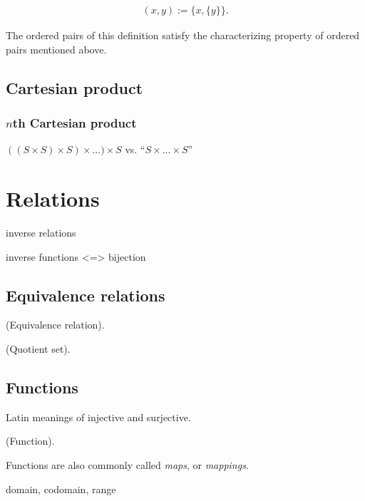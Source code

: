 \begin{align*}
    (x, y) := \{x, \{y\}\}.
\end{align*}

The ordered pairs of this definition satisfy the characterizing property of ordered pairs mentioned above.

\subsection*{Cartesian product}

\subsubsection*{$n$th Cartesian product}

$((S \times S) \times S) \times ...) \times S$ vs. ``$S \times ... \times S$''

\newpage

\section{Relations}

inverse relations

inverse functions <=> bijection

\subsection*{Equivalence relations}

\begin{defn}
    (Equivalence relation).
\end{defn}

\begin{defn}
\label{ch::logic_pf_fns::defn::quotient_set}

    (Quotient set).
\end{defn}

\subsection*{Functions}

Latin meanings of injective and surjective.

\begin{defn}
    (Function).
    
    Functions are also commonly called \textit{maps}, or \textit{mappings}.
    
    domain, codomain, range
\end{defn}

